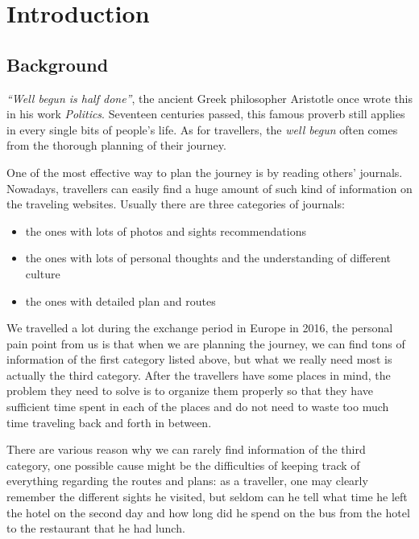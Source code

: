 \documentclass[12pt,a4paper]{article}
\begin{document}
	\section{Introduction} %
	    \subsection{Background}
	        \textit{``Well begun is half done''}, the ancient Greek philosopher Aristotle once wrote this in his work \textit{Politics}. Seventeen centuries passed, this famous proverb still applies in every single bits of people's life. As for travellers, the \textit{well begun} often comes from the thorough planning of their journey.
	        
	        One of the most effective way to plan the journey is by reading others' journals. Nowadays, travellers can easily find a huge amount of such kind of information on the traveling websites. Usually there are three categories of journals:
	        \begin{itemize}
                \setlength\itemsep{-0.5em}
                \item the ones with lots of photos and sights recommendations
                \item the ones with lots of personal thoughts and the understanding of different culture
                \item the ones with detailed plan and routes
            \end{itemize}
            
            We travelled a lot during the exchange period in Europe in 2016, the personal pain point from us is that when we are planning the journey, we can find tons of information of the first category listed above, but what we really need most is actually the third category. After the travellers have some places in mind, the problem they need to solve is to organize them properly so that they have sufficient time spent in each of the places and do not need to waste too much time traveling back and forth in between.
            
            There are various reason why we can rarely find information of the third category, one possible cause might be the difficulties of keeping track of everything regarding the routes and plans: as a traveller, one may clearly remember the different sights he visited, but seldom can he tell what time he left the hotel on the second day and how long did he spend on the bus from the hotel to the restaurant that he had lunch.
            
\end{document}
